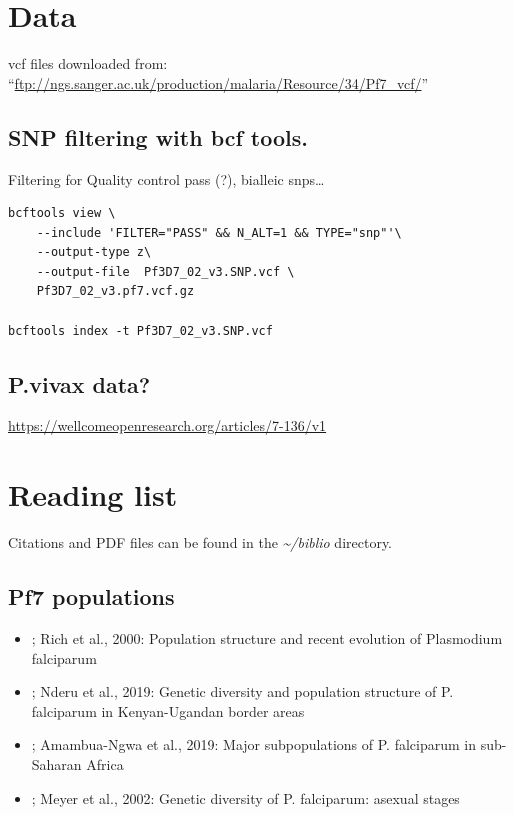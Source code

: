 \documentclass[11pt]{article}
\begin{document}
\section{Data}
\label{sec:orgc2084c4}
vcf files downloaded from: ``\url{ftp://ngs.sanger.ac.uk/production/malaria/Resource/34/Pf7\_vcf/}''

\subsection{SNP filtering with bcf tools.}
\label{sec:org3493bee}
Filtering for Quality control pass (?), bialleic snps\ldots{}

\begin{verbatim}
bcftools view \
    --include 'FILTER="PASS" && N_ALT=1 && TYPE="snp"'\
    --output-type z\
    --output-file  Pf3D7_02_v3.SNP.vcf \
    Pf3D7_02_v3.pf7.vcf.gz

bcftools index -t Pf3D7_02_v3.SNP.vcf
\end{verbatim}

\subsection{P.vivax data?}
\label{sec:org558637c}
\url{https://wellcomeopenresearch.org/articles/7-136/v1}

\section{Reading list}
\label{sec:org40fe19f}
Citations and PDF files can be found in the \emph{\textasciitilde{}/biblio} directory.
\subsection{Pf7 populations}
\label{sec:orgd5cbd97}
\begin{itemize}
\item \cite{rich-2000-popul-struc}; Rich et al., 2000: Population structure and recent evolution of Plasmodium falciparum
\item \cite{nderu-2019-genet-diver}; Nderu et al., 2019: Genetic diversity and population structure of P. falciparum in Kenyan-Ugandan border areas
\item \cite{amambua-ngwa-2019-major-subpop}; Amambua-Ngwa et al., 2019: Major subpopulations of P. falciparum in sub-Saharan Africa
\item \cite{meyer-2002-review}; Meyer et al., 2002: Genetic diversity of P. falciparum: asexual stages
\end{itemize}
\end{document}
